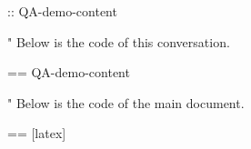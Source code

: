 \documentclass[%
  use theme = ChatGPT-light,
  scroll,
]{Q-A}
\begin{document}
:: {QA-demo-content}

"
  Below is the code of this conversation.

  == {QA-demo-content}

"
  Below is the code of the main document.

  == [latex] {\jobname}
\end{document}

